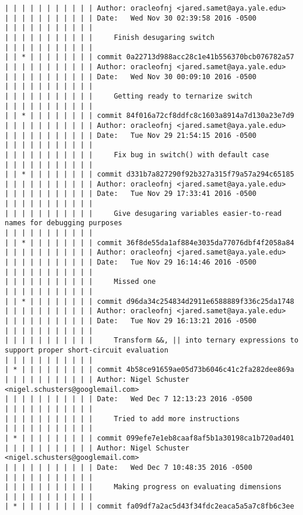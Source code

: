 \begin{lstlisting}
| | | | | | | | | | | Author: oracleofnj <jared.samet@aya.yale.edu>
| | | | | | | | | | | Date:   Wed Nov 30 02:39:58 2016 -0500
| | | | | | | | | | | 
| | | | | | | | | | |     Finish desugaring switch
| | | | | | | | | | |            
| | * | | | | | | | | commit 0a22713d988acc28c1e41b556370bcb076782a57
| | | | | | | | | | | Author: oracleofnj <jared.samet@aya.yale.edu>
| | | | | | | | | | | Date:   Wed Nov 30 00:09:10 2016 -0500
| | | | | | | | | | | 
| | | | | | | | | | |     Getting ready to ternarize switch
| | | | | | | | | | |            
| | * | | | | | | | | commit 84f016a72cf8ddfc8c1603a8914a7d130a23e7d9
| | | | | | | | | | | Author: oracleofnj <jared.samet@aya.yale.edu>
| | | | | | | | | | | Date:   Tue Nov 29 21:54:15 2016 -0500
| | | | | | | | | | | 
| | | | | | | | | | |     Fix bug in switch() with default case
| | | | | | | | | | |            
| | * | | | | | | | | commit d331b7a827290f92b327a315f79a57a294c65185
| | | | | | | | | | | Author: oracleofnj <jared.samet@aya.yale.edu>
| | | | | | | | | | | Date:   Tue Nov 29 17:33:41 2016 -0500
| | | | | | | | | | | 
| | | | | | | | | | |     Give desugaring variables easier-to-read names for debugging purposes
| | | | | | | | | | |            
| | * | | | | | | | | commit 36f8de55da1af884e3035da77076dbf4f2058a84
| | | | | | | | | | | Author: oracleofnj <jared.samet@aya.yale.edu>
| | | | | | | | | | | Date:   Tue Nov 29 16:14:46 2016 -0500
| | | | | | | | | | | 
| | | | | | | | | | |     Missed one
| | | | | | | | | | |            
| | * | | | | | | | | commit d96da34c254834d2911e6588889f336c25da1748
| | | | | | | | | | | Author: oracleofnj <jared.samet@aya.yale.edu>
| | | | | | | | | | | Date:   Tue Nov 29 16:13:21 2016 -0500
| | | | | | | | | | | 
| | | | | | | | | | |     Transform &&, || into ternary expressions to support proper short-circuit evaluation
| | | | | | | | | | |            
| * | | | | | | | | | commit 4b58ce91659ae05d73b6046c41c2fa282dee869a
| | | | | | | | | | | Author: Nigel Schuster <nigel.schusters@googlemail.com>
| | | | | | | | | | | Date:   Wed Dec 7 12:13:23 2016 -0500
| | | | | | | | | | | 
| | | | | | | | | | |     Tried to add more instructions
| | | | | | | | | | |            
| * | | | | | | | | | commit 099efe7e1eb8caaf8af5b1a30198ca1b720ad401
| | | | | | | | | | | Author: Nigel Schuster <nigel.schusters@googlemail.com>
| | | | | | | | | | | Date:   Wed Dec 7 10:48:35 2016 -0500
| | | | | | | | | | | 
| | | | | | | | | | |     Making progress on evaluating dimensions
| | | | | | | | | | |            
| * | | | | | | | | | commit fa09df7a2ac5d43f34fdc2eaca5a5a7c8fb6c3ee

\end{lstlisting}
